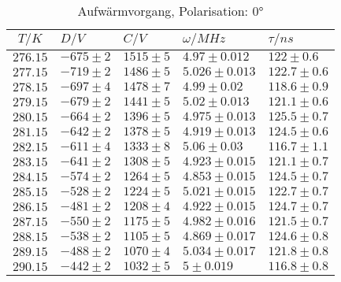 \begin{table}[h!]
\footnotesize\centering
\begin{tabular}{|c|l|l|l|l|}
\hline
$T/K$&$D/V$&$C/V$&$\omega/MHz$&$\tau/ns$\\\hline\hline
$276.15$&$-675\pm2$&$1515\pm5$&$4.97\pm0.012$&$122\pm0.6$\\\hline
$277.15$&$-719\pm2$&$1486\pm5$&$5.026\pm0.013$&$122.7\pm0.6$\\\hline
$278.15$&$-697\pm4$&$1478\pm7$&$4.99\pm0.02$&$118.6\pm0.9$\\\hline
$279.15$&$-679\pm2$&$1441\pm5$&$5.02\pm0.013$&$121.1\pm0.6$\\\hline
$280.15$&$-664\pm2$&$1396\pm5$&$4.975\pm0.013$&$125.5\pm0.7$\\\hline
$281.15$&$-642\pm2$&$1378\pm5$&$4.919\pm0.013$&$124.5\pm0.6$\\\hline
$282.15$&$-611\pm4$&$1333\pm8$&$5.06\pm0.03$&$116.7\pm1.1$\\\hline
$283.15$&$-641\pm2$&$1308\pm5$&$4.923\pm0.015$&$121.1\pm0.7$\\\hline
$284.15$&$-574\pm2$&$1264\pm5$&$4.853\pm0.015$&$124.5\pm0.7$\\\hline
$285.15$&$-528\pm2$&$1224\pm5$&$5.021\pm0.015$&$122.7\pm0.7$\\\hline
$286.15$&$-481\pm2$&$1208\pm4$&$4.922\pm0.015$&$124.7\pm0.7$\\\hline
$287.15$&$-550\pm2$&$1175\pm5$&$4.982\pm0.016$&$121.5\pm0.7$\\\hline
$288.15$&$-538\pm2$&$1105\pm5$&$4.869\pm0.017$&$124.6\pm0.8$\\\hline
$289.15$&$-488\pm2$&$1070\pm4$&$5.034\pm0.017$&$121.8\pm0.8$\\\hline
$290.15$&$-442\pm2$&$1032\pm5$&$5\pm0.019$&$116.8\pm0.8$\\\hline
\end{tabular}
\caption{Aufwärmvorgang, Polarisation: 0°\label{warm0}}
\end{table}
